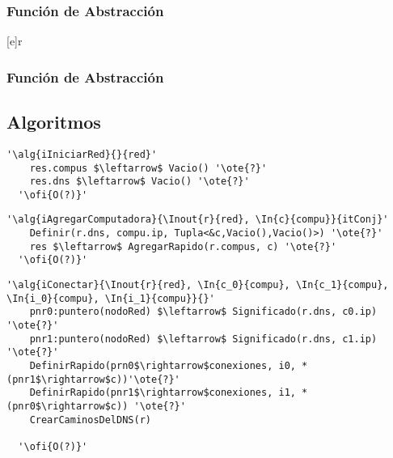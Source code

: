   \subsubsection{Función de Abstracción}

   [e]{r}{
    }
\subsubsection{Función de Abstracción}




\subsection{Algoritmos}
\lstset{style=alg}
\begin{lstlisting}[mathescape]
  '\alg{iIniciarRed}{}{red}'
    res.compus $\leftarrow$ Vacio() '\ote{?}'
    res.dns $\leftarrow$ Vacio() '\ote{?}'
  '\ofi{O(?)}'
\end{lstlisting}

\begin{lstlisting}[mathescape]
  '\alg{iAgregarComputadora}{\Inout{r}{red}, \In{c}{compu}}{itConj}'
    Definir(r.dns, compu.ip, Tupla<&c,Vacio(),Vacio()>) '\ote{?}'
    res $\leftarrow$ AgregarRapido(r.compus, c) '\ote{?}'
  '\ofi{O(?)}'
\end{lstlisting}


\begin{lstlisting}[mathescape]
  '\alg{iConectar}{\Inout{r}{red}, \In{c_0}{compu}, \In{c_1}{compu}, \In{i_0}{compu}, \In{i_1}{compu}}{}'
    pnr0:puntero(nodoRed) $\leftarrow$ Significado(r.dns, c0.ip) '\ote{?}'
    pnr1:puntero(nodoRed) $\leftarrow$ Significado(r.dns, c1.ip) '\ote{?}'
    DefinirRapido(prn0$\rightarrow$conexiones, i0, *(pnr1$\rightarrow$c))'\ote{?}'
    DefinirRapido(pnr1$\rightarrow$conexiones, i1, *(pnr0$\rightarrow$c)) '\ote{?}'
    CrearCaminosDelDNS(r)

  '\ofi{O(?)}'
\end{lstlisting}

